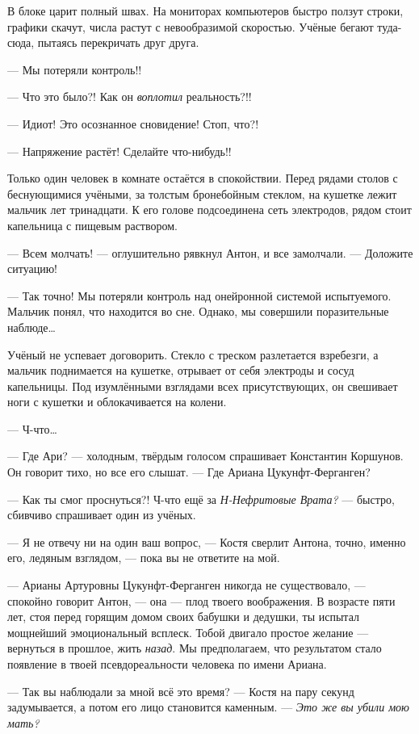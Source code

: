 \documentclass[openany, oneside]{book}
\begin{document}
В блоке царит полный швах. На мониторах компьютеров быстро ползут строки, графики скачут, числа растут с невообразимой скоростью. Учёные бегают туда-сюда, пытаясь перекричать друг друга.

--- Мы потеряли контроль!!

--- Что это было?! Как он \textit{воплотил} реальность?!!

--- Идиот! Это осознанное сновидение! Стоп, что?!

--- Напряжение растёт! Сделайте что-нибудь!!

Только один человек в комнате остаётся в спокойствии. Перед рядами столов с беснующимися учёными, за толстым бронебойным стеклом, на кушетке лежит мальчик лет тринадцати. К его голове подсоединена сеть электродов, рядом стоит капельница с пищевым раствором.

--- Всем молчать! --- оглушительно рявкнул Антон, и все замолчали. --- Доложите ситуацию!

--- Так точно! Мы потеряли контроль над онейронной системой испытуемого. Мальчик понял, что находится во сне. Однако, мы совершили поразительные наблюде\dots

Учёный не успевает договорить. Стекло с треском разлетается взребезги, а мальчик поднимается на кушетке, отрывает от себя электроды и сосуд капельницы. Под изумлёнными взглядами всех присутствующих, он свешивает ноги с кушетки и облокачивается на колени.

--- Ч-что\dots

--- Где Ари? --- холодным, твёрдым голосом спрашивает Константин Коршунов. Он говорит тихо, но все его слышат. --- Где Ариана Цукунфт-Ферганген?

--- Как ты смог проснуться?! Ч-что ещё за \textit{Н-Нефритовые Врата?} --- быстро, сбивчиво спрашивает один из учёных.

--- Я не отвечу ни на один ваш вопрос, --- Костя сверлит Антона, точно, именно его, ледяным взглядом, --- пока вы не ответите на мой.

--- Арианы Артуровны Цукунфт-Ферганген никогда не существовало, --- спокойно говорит Антон, --- она --- плод твоего воображения. В возрасте пяти лет, стоя перед горящим домом своих бабушки и дедушки, ты испытал мощнейший эмоциональный всплеск. Тобой двигало простое желание --- вернуться в прошлое, жить \textit{назад}. Мы предполагаем, что результатом стало появление в твоей псевдореальности человека по имени Ариана.

--- Так вы наблюдали за мной всё это время? --- Костя на пару секунд задумывается, а потом его лицо становится каменным. --- \textit{Это же вы убили мою мать?}
\end{document}
